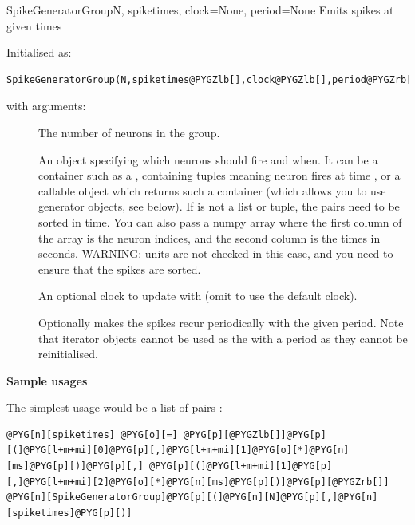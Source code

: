 \documentclass[letterpaper,10pt,english]{manual}
\begin{document}
\hypertarget{brian.SpikeGeneratorGroup}{}\begin{classdesc}{SpikeGeneratorGroup}{N, spiketimes, clock=None, period=None}
Emits spikes at given times

Initialised as:

\begin{Verbatim}[commandchars=@\[\]]
SpikeGeneratorGroup(N,spiketimes@PYGZlb[],clock@PYGZlb[],period@PYGZrb[]@PYGZrb[])
\end{Verbatim}

with arguments:
\begin{description}
\item[] \leavevmode
The number of neurons in the group.

\item[] \leavevmode
An object specifying which neurons should fire and when. It can be a container
such as a , containing tuples  meaning neuron  fires at
time , or a callable object which returns such a container (which
allows you to use generator objects, see below). If  is not
a list or tuple, the pairs  need to be sorted in time. You can
also pass a numpy array  where the first column of the
array is the neuron indices, and the second column is the times in
seconds. WARNING: units are not checked in this case, and you need to
ensure that the spikes are sorted.

\item[] \leavevmode
An optional clock to update with (omit to use the default clock).

\item[] \leavevmode
Optionally makes the spikes recur periodically with the given
period. Note that iterator objects cannot be used as the 
with a period as they cannot be reinitialised.

\end{description}

\textbf{Sample usages}

The simplest usage would be a list of pairs :

\begin{Verbatim}[commandchars=@\[\]]
@PYG[n][spiketimes] @PYG[o][=] @PYG[p][@PYGZlb[]]@PYG[p][(]@PYG[l+m+mi][0]@PYG[p][,]@PYG[l+m+mi][1]@PYG[o][*]@PYG[n][ms]@PYG[p][)]@PYG[p][,] @PYG[p][(]@PYG[l+m+mi][1]@PYG[p][,]@PYG[l+m+mi][2]@PYG[o][*]@PYG[n][ms]@PYG[p][)]@PYG[p][@PYGZrb[]]
@PYG[n][SpikeGeneratorGroup]@PYG[p][(]@PYG[n][N]@PYG[p][,]@PYG[n][spiketimes]@PYG[p][)]
\end{Verbatim}


\end{classdesc}
\end{document}
